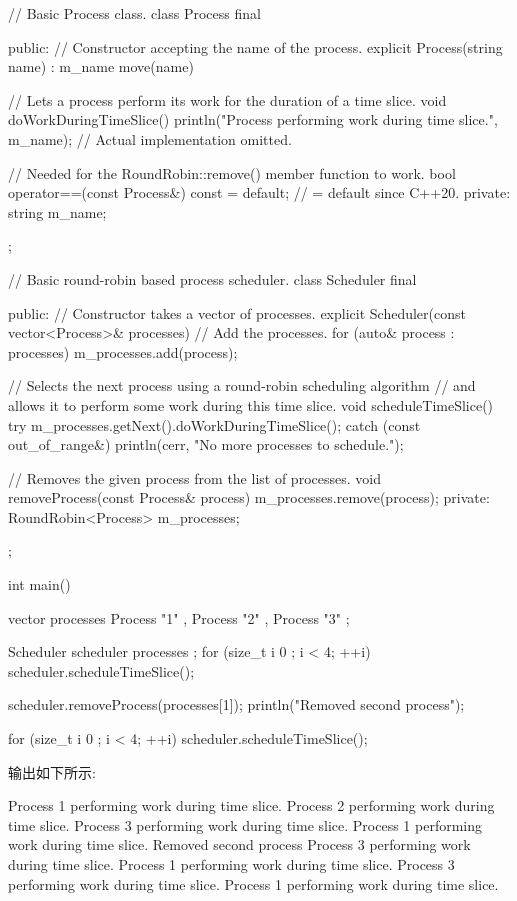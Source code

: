 \begin{cpp}
// Basic Process class.
class Process final
{
    public:
        // Constructor accepting the name of the process.
        explicit Process(string name) : m_name { move(name) } {}

        // Lets a process perform its work for the duration of a time slice.
        void doWorkDuringTimeSlice()
        {
            println("Process {} performing work during time slice.", m_name);
            // Actual implementation omitted.
        }

        // Needed for the RoundRobin::remove() member function to work.
        bool operator==(const Process&) const = default; // = default since C++20.
    private:
        string m_name;
};

// Basic round-robin based process scheduler.
class Scheduler final
{
    public:
        // Constructor takes a vector of processes.
        explicit Scheduler(const vector<Process>& processes)
        {
            // Add the processes.
            for (auto& process : processes) { m_processes.add(process); }
        }

        // Selects the next process using a round-robin scheduling algorithm
        // and allows it to perform some work during this time slice.
        void scheduleTimeSlice()
        {
            try {
                m_processes.getNext().doWorkDuringTimeSlice();
            } catch (const out_of_range&) {
                println(cerr, "No more processes to schedule.");
            }
        }

        // Removes the given process from the list of processes.
        void removeProcess(const Process& process)
        {
            m_processes.remove(process);
        }
    private:
        RoundRobin<Process> m_processes;
};

int main()
{
    vector processes { Process { "1" }, Process { "2" }, Process { "3" } };

    Scheduler scheduler { processes };
    for (size_t i { 0 }; i < 4; ++i) { scheduler.scheduleTimeSlice(); }

    scheduler.removeProcess(processes[1]);
    println("Removed second process");

    for (size_t i { 0 }; i < 4; ++i) { scheduler.scheduleTimeSlice(); }
}
\end{cpp}

输出如下所示:

\begin{shell}
Process 1 performing work during time slice.
Process 2 performing work during time slice.
Process 3 performing work during time slice.
Process 1 performing work during time slice.
Removed second process
Process 3 performing work during time slice.
Process 1 performing work during time slice.
Process 3 performing work during time slice.
Process 1 performing work during time slice.
\end{shell}


